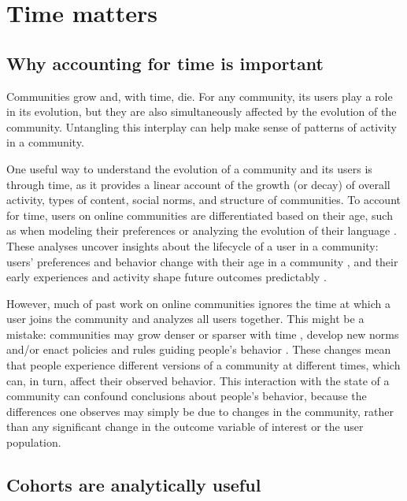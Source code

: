 \section{Time matters} 
\subsection{Why accounting for time is important}

Communities grow and, with time, die. For any community, its users play a role in its evolution, but they are also simultaneously affected by the evolution of the community. Untangling this interplay can help make sense of patterns of activity in a community.

One useful way to understand the evolution of a community and its users is through time, as it provides a linear account of the growth (or decay) of overall activity, types of content, social norms, and structure of communities. To account for time, users on online communities are differentiated based on their age, such as when modeling their preferences \cite{McAuley2013} or analyzing the evolution of their language \cite{Danescu-niculescu-mizil2013}. These analyses uncover insights about the lifecycle of a user in a community: users' preferences and behavior change with their age in a community \cite{Panciera2010}, and their early experiences and activity shape future outcomes predictably \cite{Tan2015,Yang2009,Panciera2009, Miller2015}. 

However, much of past work on online communities ignores the time at which a user joins the community and analyzes all users together.
This might be a mistake: communities may grow denser or sparser with time \cite{Leskovec2005}, develop new norms \cite{Kooti2010} and/or enact policies and rules guiding people's behavior \cite{Butler2008}.
These changes mean that people experience different versions of a community at different times, which can, in turn, affect their observed behavior. This interaction with the state of a community can confound conclusions about people's behavior, because the differences one observes may simply be due to changes in the community, rather than any significant change in the outcome variable of interest or the user population.  


\subsection{Cohorts are analytically useful}

